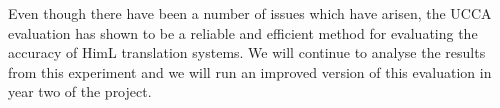 \documentclass[11pt]{article}
\begin{document}
Even though there have been a number of issues which have arisen, the UCCA evaluation has shown to be a reliable and
efficient
method for evaluating the accuracy of HimL translation systems. 
We will continue to analyse the results from this experiment and we will run an improved version of
 this evaluation in year two
of the project. 

%
\end{document}
